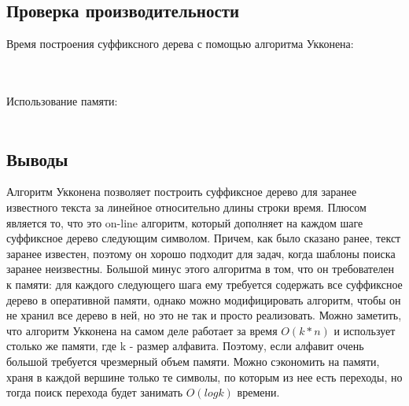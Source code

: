 \documentclass[12pt]{article}
\begin{document}
\subsection*{Проверка производительности}
Время построения суффиксного дерева с помощью алгоритма Укконена: \\ \\
\\Использование памяти:\\ \\

% 
\subsection*{Выводы}

Алгоритм Укконена позволяет построить суффиксное дерево для заранее известного текста за линейное относительно длины строки время. Плюсом является то, что это on-line алгоритм, который дополняет на каждом шаге суффиксное дерево следующим символом. Причем, как было сказано ранее, текст заранее известен, поэтому он хорошо подходит для задач, когда шаблоны поиска заранее неизвестны. Большой минус этого алгоритма в том, что он требователен к памяти: для каждого следующего шага ему требуется содержать все суффиксное дерево в оперативной памяти, однако можно модифицировать алгоритм, чтобы он не хранил все дерево в ней, но это не так и просто реализовать. Можно заметить, что алгоритм Укконена на самом деле работает за время $O(k*n)$ и использует столько же памяти, где k - размер алфавита. Поэтому, если алфавит очень большой требуется чрезмерный объем памяти. Можно сэкономить на памяти, храня в каждой вершине только те символы, по которым из нее есть переходы, но тогда поиск перехода будет занимать $O(log k)$ времени.
\end{document}
